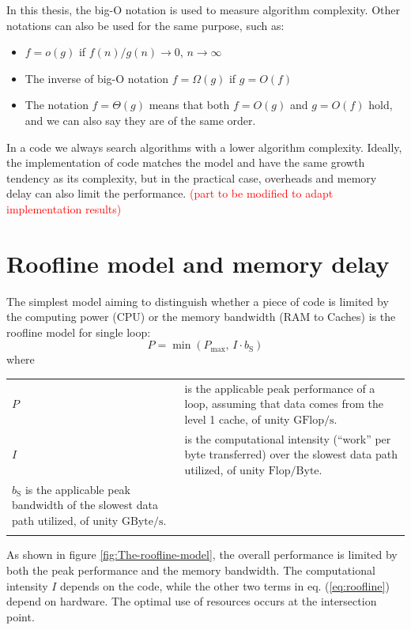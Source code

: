 In this thesis, the big-O notation is used to measure algorithm complexity.
Other notations can also be used for the same purpose, such as:
\begin{itemize}
\item $f=o(g)$ if $f(n)/g(n)\rightarrow0$, $n\rightarrow\infty$
\item The inverse of big-O notation $f=\Omega(g)$ if $g=O(f)$
\item The notation $f=\Theta(g)$ means that both $f=O(g)$ and $g=O(f)$
hold, and we can also say they are of the same order.
\end{itemize}
In a code we always search algorithms with a lower algorithm complexity.
Ideally, the implementation of code matches the model and have the
same growth tendency as its complexity, but in the practical case,
overheads and memory delay can also limit the performance. \textcolor{red}{(part
to be modified to adapt implementation results)}


\section{Roofline model and memory delay}

The simplest model aiming to distinguish whether a piece of code is
limited by the computing power (CPU) or the memory bandwidth (RAM
to Caches) is the roofline model \citep{Williams_2009_roofline} for
single loop:
\begin{equation}
P=\min\left(P_{\max},\,I\cdot b_{\mathrm{S}}\right)\label{eq:roofline}
\end{equation}
where

\begin{tabular}{l>{\raggedright}p{}}
$P$ & is the applicable peak performance of a loop, assuming that data comes
from the level 1 cache, of unity $\mathrm{GFlop/s}$. \tabularnewline
$I$ & is the computational intensity (“work” per byte transferred) over
the slowest data path utilized, of unity $\mathrm{Flop/Byte}$. \tabularnewline
$b_{\mathrm{S}}$ is the applicable peak bandwidth of the slowest data path utilized,
of unity $\mathrm{GByte/s}$.\tabularnewline
 & \tabularnewline
\end{tabular}

As shown in figure \ref{fig:The-roofline-model}, the overall performance
is limited by both the peak performance and the memory bandwidth.
The computational intensity $I$ depends on the code, while the other
two terms in eq. (\ref{eq:roofline}) depend on hardware. The optimal
use of resources occurs at the intersection point.

